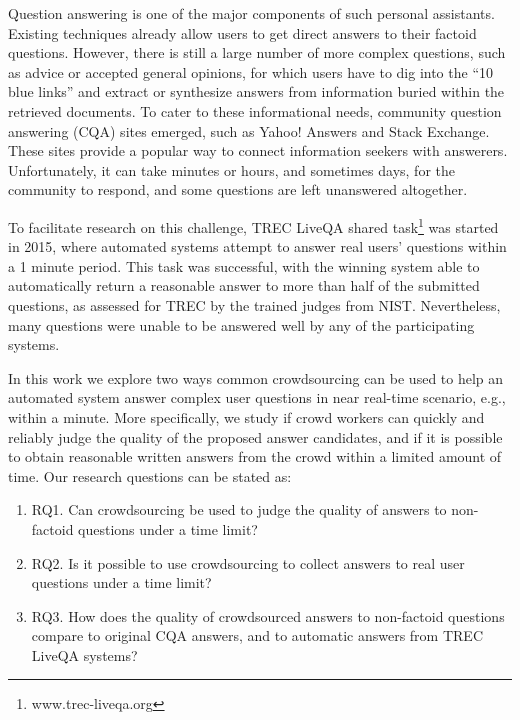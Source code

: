 \documentclass[11pt,letterpaper]{article}
\begin{document}
Question answering is one of the major components of such personal assistants.
Existing techniques already allow users to get direct answers to their factoid questions.
However, there is still a large number of more complex questions, such as advice or accepted general opinions, for which users have to dig into the ``10 blue links'' and extract or synthesize answers from information buried within the retrieved documents.
To cater to these informational needs, community question answering (CQA) sites emerged, such as Yahoo! Answers and Stack Exchange.
These sites provide a popular way to connect information seekers with answerers.
Unfortunately, it can take minutes or hours, and sometimes days, for the community to respond, and some questions are left unanswered altogether. 

To facilitate research on this challenge, TREC LiveQA shared task\footnote{www.trec-liveqa.org} was started in 2015, where automated systems attempt to answer real users' questions within a 1 minute period.
This task was successful, with the winning system able to automatically return a reasonable answer to more than half of the submitted questions, as assessed for TREC by the trained judges from NIST.
Nevertheless, many questions were unable to be answered well by any of the participating systems.

In this work we explore two ways common crowdsourcing can be used to help an automated system answer complex user questions in near real-time scenario, e.g., within a minute.
More specifically, we study if crowd workers can quickly and reliably judge the quality of the proposed answer candidates, and if it is possible to obtain reasonable written answers from the crowd within a limited amount of time.
Our research questions can be stated as:
\vspace{-0.3cm}
\begin{enumerate}
\setlength{\itemsep}{0pt}
\setlength{\parskip}{0pt}
\item RQ1. Can crowdsourcing be used to judge the quality of answers to non-factoid questions under a time limit?
\item RQ2. Is it possible to use crowdsourcing to collect answers to real user questions under a time limit?
\item RQ3. How does the quality of crowdsourced answers to non-factoid questions compare to original CQA answers, and to automatic answers from TREC LiveQA systems?
\end{enumerate}
\end{document}
